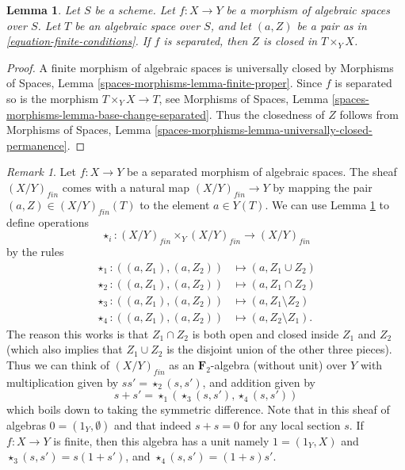 \documentclass{stacks-project}
\theoremstyle{plain}
\newtheorem{lemma}[subsection]{Lemma}
\theoremstyle{definition}
\theoremstyle{remark}
\newtheorem{remark}[subsection]{Remark}
\numberwithin{equation}{subsection}
\begin{document}
\begin{lemma}
\label{lemma-finite-separated}
Let $S$ be a scheme.
Let $f : X \to Y$ be a morphism of algebraic spaces over $S$.
Let $T$ be an algebraic space over $S$, and let $(a, Z)$ be
a pair as in \ref{equation-finite-conditions}.
If $f$ is separated, then $Z$ is closed in $T \times_Y X$.
\end{lemma}

\begin{proof}
A finite morphism of algebraic spaces is universally closed by
Morphisms of Spaces, Lemma \ref{spaces-morphisms-lemma-finite-proper}.
Since $f$ is separated so is the morphism $T \times_Y X \to T$, see
Morphisms of Spaces, Lemma \ref{spaces-morphisms-lemma-base-change-separated}.
Thus the closedness of $Z$ follows from
Morphisms of Spaces,
Lemma \ref{spaces-morphisms-lemma-universally-closed-permanence}.
\end{proof}

\begin{remark}
\label{remark-finite-monoid}
Let $f : X \to Y$ be a separated morphism of algebraic spaces.
The sheaf $(X/Y)_{fin}$ comes with a natural map
$(X/Y)_{fin} \to Y$ by mapping the pair $(a, Z) \in (X/Y)_{fin}(T)$
to the element $a \in Y(T)$. We can use
Lemma \ref{lemma-finite-separated}
to define operations
$$
\star_i : (X/Y)_{fin} \times_Y (X/Y)_{fin} \longrightarrow (X/Y)_{fin}
$$
by the rules
\begin{align*}
\star_1 : ((a, Z_1), (a, Z_2)) & \longmapsto (a, Z_1 \cup Z_2) \\
\star_2 : ((a, Z_1), (a, Z_2)) & \longmapsto (a, Z_1 \cap Z_2) \\
\star_3 : ((a, Z_1), (a, Z_2)) & \longmapsto (a, Z_1 \setminus Z_2) \\
\star_4 : ((a, Z_1), (a, Z_2)) & \longmapsto (a, Z_2 \setminus Z_1).
\end{align*}
The reason this works is that $Z_1 \cap Z_2$ is both open and closed
inside $Z_1$ and $Z_2$ (which also implies that $Z_1 \cup Z_2$ is
the disjoint union of the other three pieces).
Thus we can think of $(X/Y)_{fin}$ as an $\mathbf{F}_2$-algebra
(without unit) over $Y$ with multiplication given by
$ss' = \star_2(s, s')$, and addition given by
$$
s + s' = \star_1(\star_3(s, s'), \star_4(s, s'))
$$
which boils down to taking the symmetric difference.
Note that in this sheaf of algebras $0 = (1_Y, \emptyset)$
and that indeed $s + s = 0$ for any local section $s$.
If $f : X \to Y$ is finite, then this algebra has a unit namely
$1 = (1_Y, X)$ and $\star_3(s, s') = s(1 + s')$, and
$\star_4(s, s') = (1 + s)s'$.
\end{remark}
\end{document}
